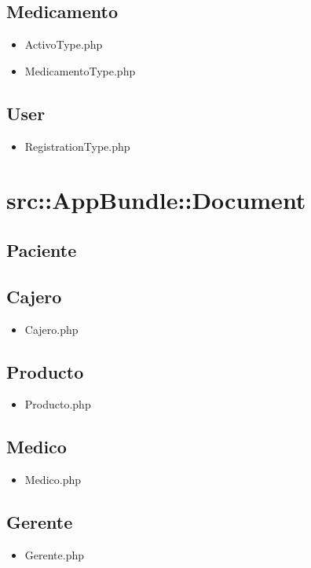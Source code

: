 		\subsection{Medicamento}
		\begin{itemize}
			\item ActivoType.php
			\item MedicamentoType.php
		\end{itemize}
		\subsection{User}
		\begin{itemize}
		\item RegistrationType.php
		\end{itemize}
	\newpage	
	\section{src::AppBundle::Document}
	
	\subsection{Paciente}
		\subsection{Cajero}
		\begin{itemize}
			\item Cajero.php
		\end{itemize}				
		
		\subsection{Producto}
		\begin{itemize}
			\item Producto.php
		\end{itemize}				
		
		\subsection{Medico}
		\begin{itemize}
			\item Medico.php
		\end{itemize}				
		
		\subsection{Gerente}
		\begin{itemize}
			\item Gerente.php
		\end{itemize}				
		
